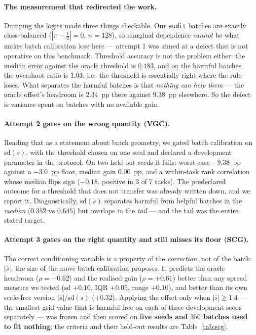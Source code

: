\paragraph{The measurement that redirected the work.}
Dumping the logits made three things checkable. Our \texttt{audit} batches are
exactly class-balanced ($|\pi-\tfrac12|=0$, $n=128$), so marginal dependence
\emph{cannot} be what makes batch calibration lose here --- attempt 1 was aimed at a
defect that is not operative on this benchmark. Threshold accuracy is not the problem
either: the median error against the oracle threshold is $0.183$, and on the harmful
batches the overshoot ratio is $1.03$, i.e.\ the threshold is essentially right where
the rule loses. What separates the harmful batches is that \emph{nothing can help
them} --- the oracle offset's headroom is $2.34$~pp there against $9.38$~pp
elsewhere. So the defect is variance spent on batches with no available gain.

\paragraph{Attempt 2 gates on the wrong quantity (VGC).}
Reading that as a statement about batch geometry, we gated batch calibration on
$\mathrm{sd}(s)$, with the threshold chosen on one seed and declared a development
parameter in the protocol. On two held-out seeds it fails: worst case $-9.38$~pp
against a $-3.0$~pp floor, median gain $0.00$~pp, and a within-task rank correlation
whose median flips sign ($-0.18$, positive in $3$ of $7$ tasks). The predeclared
outcome for a threshold that does not transfer was already written down, and we
report it. Diagnostically, $\mathrm{sd}(s)$ separates harmful from helpful batches in
the \emph{median} ($0.352$ vs $0.645$) but overlaps in the \emph{tail} --- and the
tail was the entire stated target.

\paragraph{Attempt 3 gates on the right quantity and still misses its floor (SCG).}
The correct conditioning variable is a property of the \emph{correction}, not of the
batch: $|\overline{s}|$, the size of the move batch calibration proposes. It predicts
the oracle headroom ($\rho=+0.62$) and the realised gain ($\rho=+0.61$) better than
any spread measure we tested ($\mathrm{sd}$ $+0.10$, IQR $+0.05$, range $+0.10$),
and better than its own scale-free version $|\overline{s}|/\mathrm{sd}(s)$ ($+0.32$).
Applying the offset only when $|\overline{s}|\ge 1.4$ --- the smallest grid value that
is harmful-free on each of three development seeds separately --- was frozen and then
scored on \textbf{five seeds and $350$ batches used to fit nothing}; the criteria and
their held-out results are Table~\ref{tab:scg}.


